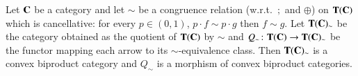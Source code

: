 \begin{proposition}\label{cor: quotient category is convex biproduct }
Let $\Cat{C}$ be a category and let $\sim$ be a congruence relation (w.r.t.\ $;$ and $\oplus$) on $\CatTapeC$ which is cancellative: for every $p\in (0,1)$, $p\cdot f\sim p\cdot g$ then $f\sim g$. Let $\CatTapeC_\sim$ be the category obtained as the quotient of $\CatTapeC$ by $\sim$ and $Q_\sim \colon \CatTapeC\to \CatTapeC_\sim$ be the functor mapping each arrow to its $\sim$-equivalence class.
Then $\CatTapeC_\sim$ is a convex biproduct category and $Q_\sim$ is a morphism of convex biproduct categories.
\end{proposition}